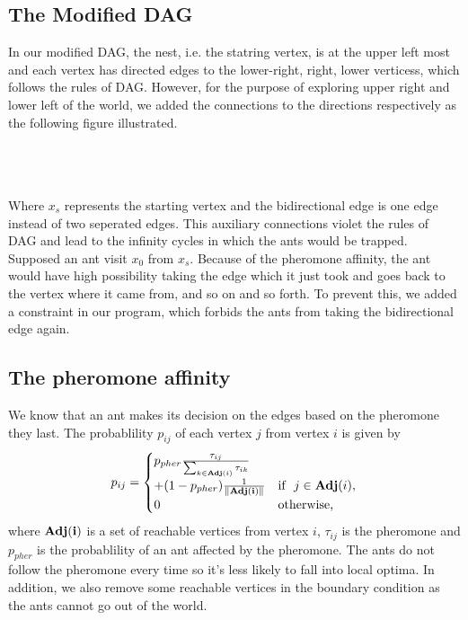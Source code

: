 \documentclass[12pt,journal,compsoc]{IEEEtran}
\begin{document}
\subsection{The Modified DAG}
In our modified DAG, the nest, i.e. the statring vertex, is at the upper left most and each vertex has directed edges to the lower-right, right, lower verticess, which follows the rules of DAG. However, for the purpose of exploring upper right and lower left of the world, we added the connections to the directions respectively as the following figure illustrated.\\\\
\\\\
Where $x_s$ represents the starting vertex and the bidirectional edge is one edge instead of two seperated edges. This auxiliary connections violet the rules of DAG and lead to the infinity cycles in which the ants would be trapped. Supposed an ant visit $x_0$ from $x_s$. Because of the pheromone affinity, the ant would have high possibility taking the edge which it just took and goes back to the vertex where it came from, and so on and so forth. To prevent this, we added a constraint in our program, which forbids the ants from taking the bidirectional edge again.

\subsection{The pheromone affinity}
We know that an ant makes its decision on the edges based on the pheromone they last. The probablility $p_{ij}$ of each vertex $j$ from vertex $i$ is given by
\[p_{ij}=\begin{cases} p_{pher}{\tau_{ij}\over \sum\nolimits_{k\in {\bf Adj}(i)}\tau_{ik}}\\ + (1-p_{pher}){1\over\|\bf Adj(i)\|} &\mbox{if }\ j\in {\bf Adj}(i), \\
0 & \mbox{otherwise,}\end{cases}\]
where $\bf Adj(i)$ is a set of reachable vertices from vertex $i$, $\tau_{ij}$ is the pheromone and $p_{pher}$ is the probablility of an ant affected by the pheromone. The ants do not follow the pheromone every time so it's less likely to fall into local optima. In addition, we also remove some reachable vertices in the boundary condition as the ants cannot go out of the world.
\end{document}

